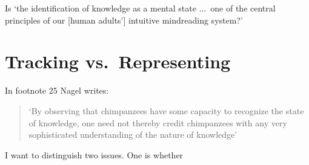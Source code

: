 \documentclass[11pt,a4paper]{extarticle}
\begin{document}
Is `the identification of knowledge as a mental state ...\ one of the central principles of our [human adults'] intuitive mindreading system?'




\section{Tracking vs.\ Representing}




In footnote 25 Nagel writes:
%
\begin{quote}
`By observing that chimpanzees have some capacity to recognize the state of knowledge, one need not thereby credit chimpanzees with any very sophisticated understanding of the nature of knowledge'
\end{quote}
%
I want to distinguish two issues.
One is whether 





\end{document}
